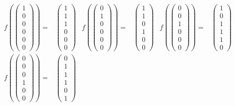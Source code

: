 \documentclass[a4paper, 12pt]{article}
\begin{document}
\begin{singlespace}
\begin{align*}
f\left(\begin{pmatrix}1\\0\\0\\0\\0\\0\end{pmatrix}\right) =&
\begin{pmatrix}1\\1\\1\\0\\0\\0\end{pmatrix}&
f\left(\begin{pmatrix}0\\1\\0\\0\\0\\0\end{pmatrix}\right) =&
\begin{pmatrix}1\\1\\0\\1\\0\\0\end{pmatrix}&
f\left(\begin{pmatrix}0\\0\\1\\0\\0\\0\end{pmatrix}\right) =&
\begin{pmatrix}1\\0\\1\\1\\1\\0\end{pmatrix}\\
f\left(\begin{pmatrix}0\\0\\0\\1\\0\\0\end{pmatrix}\right) =&
\begin{pmatrix}0\\1\\1\\1\\0\\1\end{pmatrix}&

\end{align*}
\end{singlespace}
\end{document}
